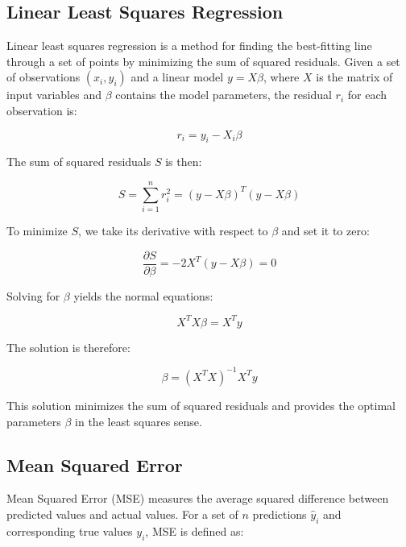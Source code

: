\subsection{Linear Least Squares Regression}
Linear least squares regression is a method for finding the best-fitting line through a set of points by minimizing the sum of squared residuals. Given a set of observations \((x_i, y_i)\) and a linear model \(y = X\beta\), where \(X\) is the matrix of input variables and \(\beta\) contains the model parameters, the residual \(r_i\) for each observation is:

\begin{equation}
\label{eq:residual}
r_i = y_i - X_i\beta
\end{equation}

The sum of squared residuals \(S\) is then:

\begin{equation}
\label{eq:sum_squared_residuals} 
S = \sum_{i=1}^n r_i^2 = (y - X\beta)^T(y - X\beta)
\end{equation}

To minimize \(S\), we take its derivative with respect to \(\beta\) and set it to zero:

\begin{equation}
\label{eq:derivative_residuals}
\frac{\partial S}{\partial \beta} = -2X^T(y - X\beta) = 0
\end{equation}

Solving for \(\beta\) yields the normal equations:

\begin{equation}
\label{eq:normal_equations}
X^TX\beta = X^Ty
\end{equation}

The solution is therefore:

\begin{equation}
\label{eq:least_squares_solution}
\beta = (X^TX)^{-1}X^Ty
\end{equation}

This solution minimizes the sum of squared residuals and provides the optimal parameters \(\beta\) in the least squares sense.

\subsection{Mean Squared Error}
Mean Squared Error (MSE) measures the average squared difference between predicted values and actual values. For a set of \(n\) predictions \(\hat{y}_i\) and corresponding true values \(y_i\), MSE is defined as:

